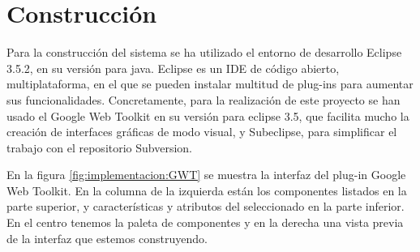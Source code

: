 
\label{chap:implementacion}

\chaptertoc



\section{Construcción}
\label{sec:implementacion:construccion}

Para la construcción del sistema se ha utilizado el entorno de desarrollo Eclipse 3.5.2, en su versión para java.
Eclipse es un IDE de código abierto, multiplataforma, en el que se pueden instalar multitud de plug-ins para aumentar sus funcionalidades. Concretamente, para la realización de este proyecto se han usado el Google Web Toolkit en su versión para eclipse 3.5, que facilita mucho la creación de interfaces gráficas de modo visual, y Subeclipse, para simplificar el trabajo con el repositorio Subversion.
\newline

En la figura \ref{fig:implementacion:GWT} se muestra la interfaz del plug-in Google Web Toolkit. En la columna de la izquierda están los componentes listados en la parte superior, y características y atributos del seleccionado en la parte inferior. En el centro tenemos la paleta de componentes y en la derecha una vista previa de la interfaz que estemos construyendo.


